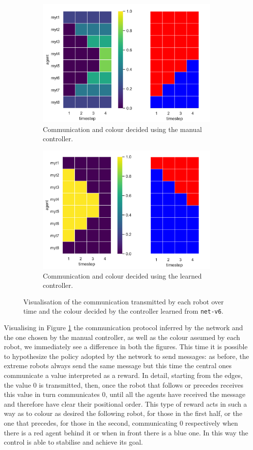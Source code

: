 \begin{figure}[!htb]
	\begin{subfigure}[h]{\textwidth}
		\centering
		\includegraphics[width=.55\textwidth]{contents/images/net-v6/manual-0}
		\caption{Communication and colour decided using the manual controller.}
	\end{subfigure}
	\hspace*{\fill}%
	\vspace*{8pt}%
	\hspace*{\fill}%
	\begin{subfigure}[h]{\textwidth}
		\centering			
		\includegraphics[width=.55\textwidth]{contents/images/net-v6/learned-0}
		\caption{Communication and colour decided using the learned controller.}
	\end{subfigure}
	\caption[Evaluation of the communication learned by 
	\texttt{net-v6}.]{Visualisation of the communication transmitted by each 
		robot over time and the colour decided by the controller learned from 
		\texttt{net-v6}.}	
	\label{fig:net-v6commcolour}
\end{figure}

Visualising in Figure \ref{fig:net-v6commcolour} the communication protocol 
inferred by the network and the one chosen by the manual controller, as well as 
the colour assumed by each robot, we immediately see a difference in both the 
figures.
This time it is possible to hypothesize the policy adopted by the network to send 
messages: as before, the extreme robots always send the same message but this 
time the central ones communicate a value interpreted as a reward. In detail, 
starting from the edges, the value 0 is transmitted, then, once the robot that 
follows or precedes receives this value in turn communicates 0, until all the agents 
have received the message and therefore have clear their positional order.
This type of reward acts in such a way as to colour as desired the following robot, 
for those in the first half, or the one that precedes, for those in the second, 
communicating 0 respectively when there is a red agent behind it or when in front 
there is a blue one. In this way the control is able to stabilise and achieve its goal.

